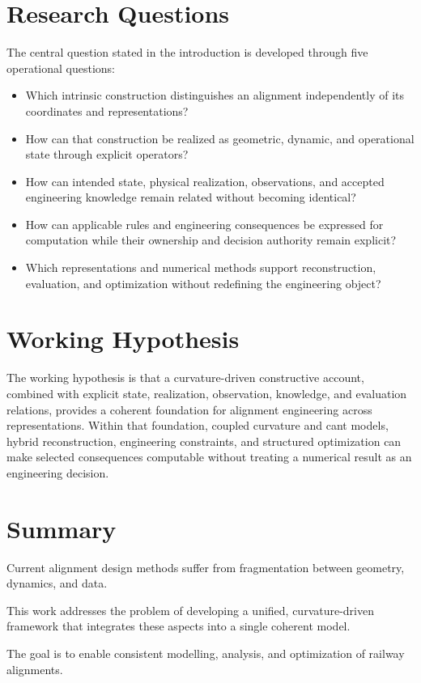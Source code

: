 \section{Research Questions}

The central question stated in the introduction is developed through five
operational questions:
\begin{itemize}
\item Which intrinsic construction distinguishes an alignment independently of
  its coordinates and representations?
\item How can that construction be realized as geometric, dynamic, and
  operational state through explicit operators?
\item How can intended state, physical realization, observations, and accepted
  engineering knowledge remain related without becoming identical?
\item How can applicable rules and engineering consequences be expressed for
  computation while their ownership and decision authority remain explicit?
\item Which representations and numerical methods support reconstruction,
  evaluation, and optimization without redefining the engineering object?
\end{itemize}

\section{Working Hypothesis}

The working hypothesis is that a curvature-driven constructive account,
combined with explicit state, realization, observation, knowledge, and
evaluation relations, provides a coherent foundation for alignment engineering
across representations. Within that foundation, coupled curvature and cant
models, hybrid reconstruction, engineering constraints, and structured
optimization can make selected consequences computable without treating a
numerical result as an engineering decision.



\section{Summary}

\begin{summary}
Current alignment design methods suffer from fragmentation between
geometry, dynamics, and data.

This work addresses the problem of developing a unified,
curvature-driven framework that integrates these aspects into a
single coherent model.

The goal is to enable consistent modelling, analysis, and optimization
of railway alignments.
\end{summary}
